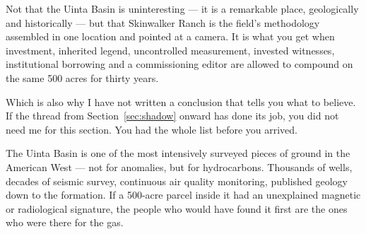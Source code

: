 Not that the Uinta Basin is uninteresting --- it is a
remarkable place, geologically and historically --- but that Skinwalker Ranch is the field's
methodology assembled in one location and pointed at a camera. It is what you get when investment,
inherited legend, uncontrolled measurement, invested witnesses, institutional borrowing and a
commissioning editor are allowed to compound on the same 500 acres for thirty years.

Which is also why I have not written a conclusion that tells you what to believe. If the thread
from Section~\ref{sec:shadow} onward has done its job, you did not need me for this section.
You had the whole list before you arrived.

\begin{funfact}
The Uinta Basin is one of the most intensively surveyed pieces of ground in the American West ---
not for anomalies, but for hydrocarbons. Thousands of wells, decades of seismic survey, continuous
air quality monitoring, published geology down to the formation. If a 500-acre parcel inside it
had an unexplained magnetic or radiological signature, the people who would have found it first
are the ones who were there for the gas.
\end{funfact}
